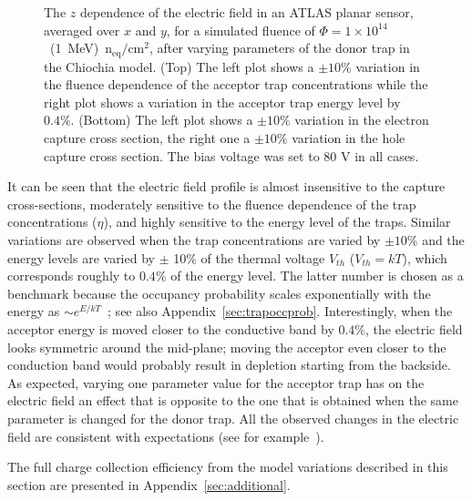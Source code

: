\begin{figure}[htpb!]
\caption{The $z$ dependence of the electric field in an ATLAS planar sensor, averaged over $x$ and $y$, for a simulated
  fluence of $\Phi=1\times10^{14}$~(1~MeV)~n$_\text{eq}/\text{cm}^{2}$, after varying parameters of the donor trap in the Chiochia model. (Top) The left plot shows a $\pm 10\%$ variation in the fluence dependence of the acceptor trap concentrations while the right plot shows a variation in the acceptor trap energy level by $0.4\%$. 
  (Bottom) The left plot shows a $\pm 10\%$ variation in the electron capture cross section, the right one a $\pm 10\%$ variation in the hole capture cross section.
The bias voltage was set to $80$ V in all cases.}
\label{fig:don_electricfieldvariations}
\end{figure}

It can be seen that the electric field profile is almost insensitive to the capture cross-sections, moderately sensitive to the fluence dependence of the trap concentrations ($\eta$), and highly sensitive to the energy level of the traps. 
Similar variations are observed when the trap concentrations are varied by $\pm10\%$ and the energy levels are varied by $\pm$ 10\% of the thermal voltage $V_{th}$ ($V_{th}=kT$), which corresponds roughly to $0.4\%$ of the energy level.  The latter number is chosen as a benchmark because the occupancy probability scales exponentially with the energy as $\sim e^{E/kT}$~\cite{LUTZ1996}; see also Appendix~\ref{sec:trapoccprob}. 
Interestingly, when the acceptor energy is moved closer to the conductive band by $0.4\%$, the electric field looks 
 symmetric around the mid-plane; moving the acceptor even closer to the conduction band would probably result in depletion 
 starting from the backside.
As expected, varying one parameter value for the acceptor trap has on the electric field an effect that is opposite 
to the one that is obtained when the same parameter is changed for the donor trap. 
All the observed changes in the electric field are consistent with expectations (see for example~\cite{LUTZ1996}).

The full charge collection efficiency from the model variations described in this section are presented in Appendix~\ref{sec:additional}.


